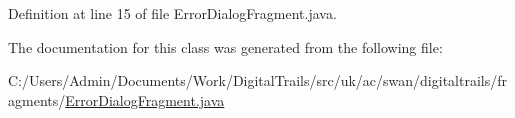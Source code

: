 Definition at line 15 of file Error\+Dialog\+Fragment.\+java.



The documentation for this class was generated from the following file\+:\begin{DoxyCompactItemize}
\item 
C\+:/\+Users/\+Admin/\+Documents/\+Work/\+Digital\+Trails/src/uk/ac/swan/digitaltrails/fragments/\hyperlink{_error_dialog_fragment_8java}{Error\+Dialog\+Fragment.\+java}\end{DoxyCompactItemize}
